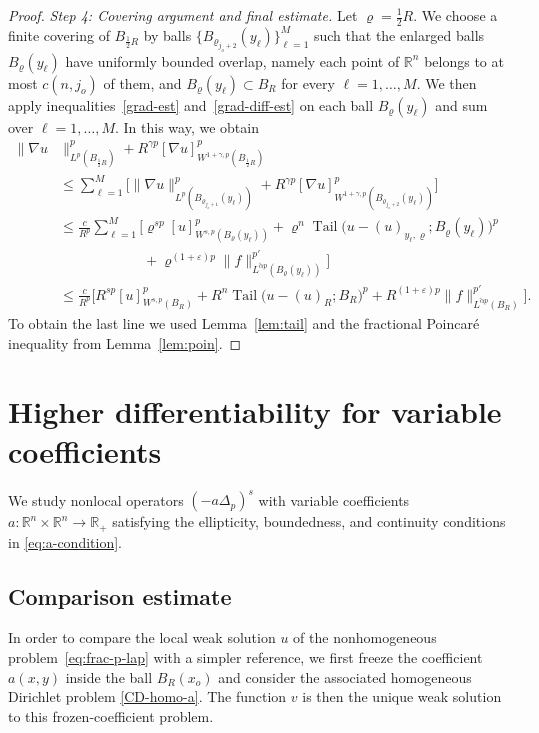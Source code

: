 \documentclass[10pt,letterpaper]{amsart}
\theoremstyle{definition}
\numberwithin{theorem}{section}
\numberwithin{equation}{section}
\newcommand{\1}{\ensuremath{\mathds{1}}}
\renewcommand{\epsilon}{\varepsilon}
\renewcommand{\rho}{\varrho}
\renewcommand{\epsilon}{\varepsilon}
\renewcommand{\rho}{\varrho}
\DeclareMathOperator{\Tail}{Tail}
\numberwithin{equation}{section}
\begin{document}
\begin{proof}
\noindent
\textit{Step 4: Covering argument and final estimate.}
Let \(\rho=\tfrac12 R\).
We choose a finite covering of \(B_{\frac12 R}\) by balls
\(\{B_{\rho_{j_o+2}}(y_\ell)\}_{\ell=1}^M\) such that the enlarged balls
\(B_\rho(y_\ell)\) have uniformly bounded overlap, namely each point of
\(\mathbb{R}^n\) belongs to at most \(c(n,j_o)\) of them, and
\(B_\rho(y_\ell)\subset B_R\) for every \(\ell=1,\dots,M\).
We then apply inequalities~\eqref{grad-est} and~\eqref{grad-diff-est} on
each ball \(B_\rho(y_\ell)\) and sum over \(\ell=1,\dots,M\). In this way, we obtain 
\begin{align*}
    \|\nabla u&\|_{L^p(B_{\frac12 R})}^p +
    R^{\gamma p} [\nabla u]_{W^{1+ \gamma, p}(B_{\frac12 R})}^p \\
    &\leq 
    \sum_{\ell=1}^M 
    \Big[ \|\nabla u\|^p_{L^p(B_{\rho_{j_o+1}}(y_\ell))} + 
    R^{\gamma p} [\nabla u]_{W^{1+ \gamma, p}(B_{\rho_{j_o+2}}(y_\ell))}^p \Big]\\
    &\leq 
    \frac{c}{R^{p}} 
    \sum_{\ell=1}^M
    \bigg[ \rho^{sp} [u]^p_{W^{s, p}(B_{\rho}(y_\ell))} + 
    \rho^n \Tail\big(u-(u)_{y_\ell,\rho}; B_{\rho}(y_\ell)\big)^p\\
    &\qquad\qquad\qquad+ 
    \rho^{(1+\epsilon)p}\|f\|_{L^{\tilde \alpha p}(B_{\rho}(y_\ell))}^{p'} \bigg] \\
    &\leq 
    \frac{c}{R^{p}} 
    \bigg[ R^{sp} [u]^p_{W^{s, p}(B_{R})} + 
    R^n \Tail\big(u-(u)_R; B_{R}\big)^p + 
    R^{(1+\epsilon)p}\|f\|_{L^{\tilde \alpha p}(B_{R})}^{p'} \bigg].
\end{align*}
To obtain the last line we used Lemma~\ref{lem:tail} and the fractional Poincar\'e inequality from Lemma~\ref{lem:poin}.
\end{proof}




\section{Higher differentiability for variable coefficients}\label{S:4}
We study nonlocal operators $(-a\Delta_p)^s$ with variable coefficients 
$a\colon\mathbb{R}^n \times \mathbb{R}^n \to \mathbb{R}_+$ satisfying the ellipticity, boundedness, and continuity conditions in \eqref{eq:a-condition}.



\subsection{Comparison estimate}
In order to compare the local weak solution $u$ of the nonhomogeneous problem~\eqref{eq:frac-p-lap} with a simpler reference, 
we first freeze the coefficient $a(x,y)$ inside the ball $B_R(x_o)$ and consider the associated homogeneous Dirichlet problem 
\eqref{CD-homo-a}. The function $v$ is then the unique weak solution to this frozen-coefficient problem. 
\end{document}
